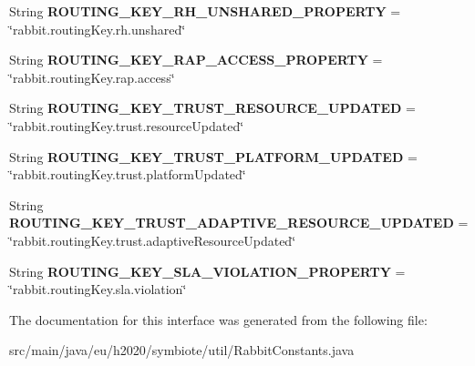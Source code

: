 \begin{DoxyCompactItemize}
String {\bfseries R\+O\+U\+T\+I\+N\+G\+\_\+\+K\+E\+Y\+\_\+\+R\+H\+\_\+\+U\+N\+S\+H\+A\+R\+E\+D\+\_\+\+P\+R\+O\+P\+E\+R\+TY} = \char`\"{}rabbit.\+routing\+Key.\+rh.\+unshared\char`\"{}
\item 
\mbox{\label{interfaceeu_1_1h2020_1_1symbiote_1_1util_1_1RabbitConstants_a424464916efde849ac799fe98c4808c3}} 
String {\bfseries R\+O\+U\+T\+I\+N\+G\+\_\+\+K\+E\+Y\+\_\+\+R\+A\+P\+\_\+\+A\+C\+C\+E\+S\+S\+\_\+\+P\+R\+O\+P\+E\+R\+TY} = \char`\"{}rabbit.\+routing\+Key.\+rap.\+access\char`\"{}
\item 
\mbox{\label{interfaceeu_1_1h2020_1_1symbiote_1_1util_1_1RabbitConstants_a7a789ef5d6effb858bc3ebe4da703631}} 
String {\bfseries R\+O\+U\+T\+I\+N\+G\+\_\+\+K\+E\+Y\+\_\+\+T\+R\+U\+S\+T\+\_\+\+R\+E\+S\+O\+U\+R\+C\+E\+\_\+\+U\+P\+D\+A\+T\+ED} = \char`\"{}rabbit.\+routing\+Key.\+trust.\+resource\+Updated\char`\"{}
\item 
\mbox{\label{interfaceeu_1_1h2020_1_1symbiote_1_1util_1_1RabbitConstants_a7e8dbe4602f0289ab48ddacbf89d5576}} 
String {\bfseries R\+O\+U\+T\+I\+N\+G\+\_\+\+K\+E\+Y\+\_\+\+T\+R\+U\+S\+T\+\_\+\+P\+L\+A\+T\+F\+O\+R\+M\+\_\+\+U\+P\+D\+A\+T\+ED} = \char`\"{}rabbit.\+routing\+Key.\+trust.\+platform\+Updated\char`\"{}
\item 
\mbox{\label{interfaceeu_1_1h2020_1_1symbiote_1_1util_1_1RabbitConstants_a135dc4b277033115a067cf9a86852c77}} 
String {\bfseries R\+O\+U\+T\+I\+N\+G\+\_\+\+K\+E\+Y\+\_\+\+T\+R\+U\+S\+T\+\_\+\+A\+D\+A\+P\+T\+I\+V\+E\+\_\+\+R\+E\+S\+O\+U\+R\+C\+E\+\_\+\+U\+P\+D\+A\+T\+ED} = \char`\"{}rabbit.\+routing\+Key.\+trust.\+adaptive\+Resource\+Updated\char`\"{}
\item 
\mbox{\label{interfaceeu_1_1h2020_1_1symbiote_1_1util_1_1RabbitConstants_a70c44f5aa141fc7bc36e7859bf0215eb}} 
String {\bfseries R\+O\+U\+T\+I\+N\+G\+\_\+\+K\+E\+Y\+\_\+\+S\+L\+A\+\_\+\+V\+I\+O\+L\+A\+T\+I\+O\+N\+\_\+\+P\+R\+O\+P\+E\+R\+TY} = \char`\"{}rabbit.\+routing\+Key.\+sla.\+violation\char`\"{}
\end{DoxyCompactItemize}


The documentation for this interface was generated from the following file\+:\begin{DoxyCompactItemize}
\item 
src/main/java/eu/h2020/symbiote/util/Rabbit\+Constants.\+java\end{DoxyCompactItemize}
